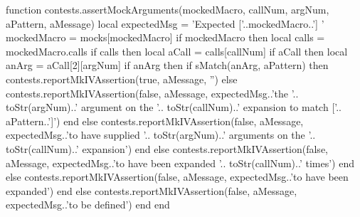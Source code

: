 \stopTestCase

\startConTest
\startMocking
  \startAssertShouldFail{}{}{}
  \stopAssertShouldFail
  \aContextMock
  \startAssertShouldFail{}{}{}
  \stopAssertShouldFail
  \startAssertShouldFail{}{}{}
  \stopAssertShouldFail
\stopMocking
\stopConTest
\stopTestCase
\stopTestSuite

\startTestSuite[assertMockNthArgumentOnMthExpansionMatches]

\startMkIVCode
\def\assertMockNthArgumentOnMthExpansionMatches#1#2#3#4#5{%
  \directlua{%
    thirddata.contests.assertMockArguments(
      '#1', #3, #2, '#4', '#5'
    )
  }
}
\stopMkIVCode

\startLuaCode
function contests.assertMockArguments(mockedMacro,
                                      callNum,
                                      argNum,
                                      aPattern,
                                      aMessage)
  local expectedMsg = 'Expected ['..mockedMacro..'] '
  mockedMacro = mocks[mockedMacro]
  if mockedMacro then
    local calls = mockedMacro.calls
    if calls then
      local aCall = calls[callNum]
      if aCall then
        local anArg = aCall[2][argNum]
        if anArg then
          if sMatch(anArg, aPattern) then
            contests.reportMkIVAssertion(true, aMessage, '')
          else
            contests.reportMkIVAssertion(false, aMessage,
              expectedMsg..'the '..
              toStr(argNum)..' argument on the '..
              toStr(callNum)..' expansion to match ['..
              aPattern..']')
          end
        else
          contests.reportMkIVAssertion(false, aMessage,
            expectedMsg..'to have supplied '..
            toStr(argNum)..' arguments on the '..
            toStr(callNum)..' expansion')
        end
      else
        contests.reportMkIVAssertion(false, aMessage,
          expectedMsg..'to have been expanded '..
          toStr(callNum)..' times')
      end
    else
      contests.reportMkIVAssertion(false, aMessage,
        expectedMsg..'to have been expanded')
    end
  else
    contests.reportMkIVAssertion(false, aMessage,
      expectedMsg..'to be defined')
  end
end
\stopLuaCode


